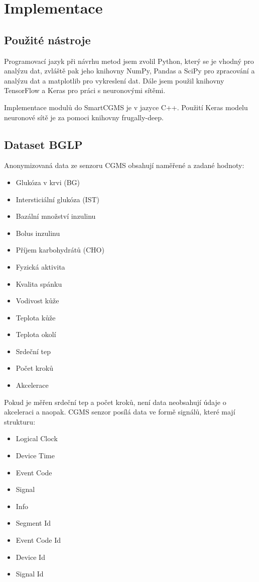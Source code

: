 \chapter{Implementace}

\section{Použité nástroje}

Programovací jazyk při návrhu metod jsem zvolil Python, který se je vhodný pro analýzu dat, zvláště pak jeho knihovny NumPy, Pandas a SciPy pro zpracování a analýzu dat a matplotlib pro vykreslení dat. Dále jsem použil knihovny TensorFlow a Keras pro práci s neuronovými sítěmi.

Implementace modulů do SmartCGMS je v jazyce C++. Použití Keras modelu neuronové sítě je za pomoci knihovny frugally-deep.

\section{Dataset BGLP}

Anonymizovaná data ze senzoru CGMS obsahují naměřené a zadané hodnoty:
\begin{itemize}
\setlength\itemsep{0em}
\item Glukóza v krvi (BG)
\item Intersticiální glukóza (IST)
\item Bazální množství inzulinu
\item Bolus inzulinu
\item Příjem karbohydrátů (CHO)
\item Fyzická aktivita
\item Kvalita spánku
\item Vodivost kůže
\item Teplota kůže
\item Teplota okolí
\item Srdeční tep
\item Počet kroků
\item Akcelerace
\end{itemize}

Pokud je měřen srdeční tep a počet kroků, není data neobsahují údaje o akceleraci a naopak. CGMS senzor posílá data ve formě signálů, které mají strukturu:
\begin{itemize}
\setlength\itemsep{0em}
\item Logical Clock
\item Device Time
\item Event Code
\item Signal
\item Info
\item Segment Id
\item Event Code Id
\item Device Id
\item Signal Id
\end{itemize}

